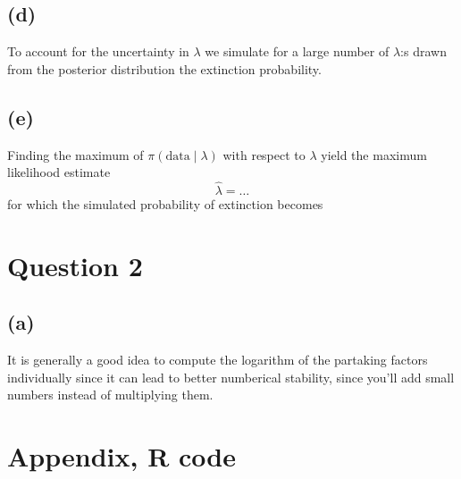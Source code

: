 \documentclass{article}
\begin{document}
\subsection{(d)}
To account for the uncertainty in $\lambda$ we simulate for
a large number of $\lambda$:s drawn from the posterior distribution
the extinction probability.

\subsection{(e)}
Finding the maximum of $\pi(\text{data} \mid \lambda)$ with respect to $\lambda$
yield the maximum likelihood estimate
$$ \hat\lambda = \ldots $$ %
for which the simulated probability of extinction becomes

\section{Question 2}
\subsection{(a)}
It is generally a good idea to
compute the logarithm of the partaking factors individually
since it can lead to better numberical stability,
since you'll add small numbers instead of multiplying them.

\appendix
\section{Appendix, R code}
% 
\end{document}
